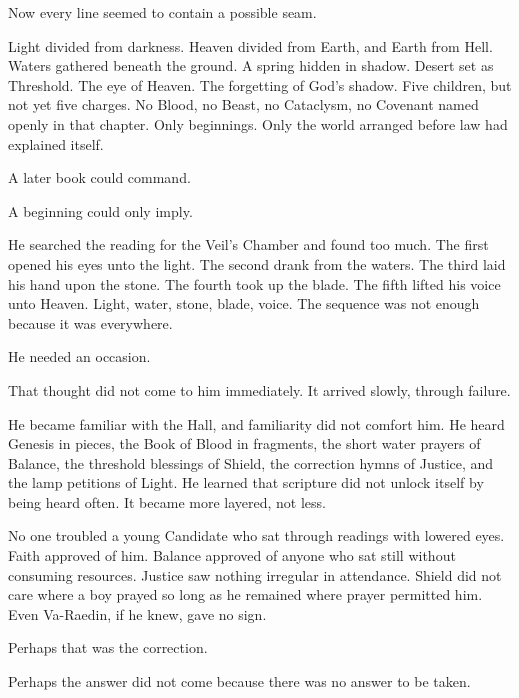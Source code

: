 Now every line seemed to contain a possible seam.\par

Light divided from darkness. Heaven divided from Earth, and Earth from Hell. Waters gathered beneath the ground. A spring hidden in shadow. Desert set as Threshold. The eye of Heaven. The forgetting of God’s shadow. Five children, but not yet five charges. No Blood, no Beast, no Cataclysm, no Covenant named openly in that chapter. Only beginnings. Only the world arranged before law had explained itself.\par

A later book could command.\par

A beginning could only imply.\par

He searched the reading for the Veil’s Chamber and found too much. The first opened his eyes unto the light. The second drank from the waters. The third laid his hand upon the stone. The fourth took up the blade. The fifth lifted his voice unto Heaven. Light, water, stone, blade, voice. The sequence was not enough because it was everywhere.\par

He needed an occasion.\par

That thought did not come to him immediately. It arrived slowly, through failure.\par

He became familiar with the Hall, and familiarity did not comfort him. He heard Genesis in pieces, the Book of Blood in fragments, the short water prayers of Balance, the threshold blessings of Shield, the correction hymns of Justice, and the lamp petitions of Light. He learned that scripture did not unlock itself by being heard often. It became more layered, not less.\par

No one troubled a young Candidate who sat through readings with lowered eyes. Faith approved of him. Balance approved of anyone who sat still without consuming resources. Justice saw nothing irregular in attendance. Shield did not care where a boy prayed so long as he remained where prayer permitted him. Even Va-Raedin, if he knew, gave no sign.\par

Perhaps that was the correction.\par

Perhaps the answer did not come because there was no answer to be taken.\par

